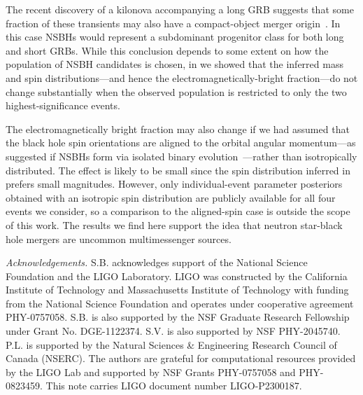 \documentclass[twocolumn]{aastex631}
\begin{document}
The recent discovery of a kilonova accompanying a long GRB suggests that some fraction of these transients may also have a compact-object merger origin~\citep{Troja:2022yya, Rastinejad:2022zbg}. In this case NSBHs would represent a subdominant progenitor class for both long and short GRBs. While this conclusion depends to some extent on how the population of NSBH candidates is chosen, 
in  we showed that the inferred mass and spin distributions---and hence the electromagnetically-bright fraction---do not change substantially when the observed population is restricted to only the two highest-significance events.%

The electromagnetically bright fraction may also change if we had assumed that the black hole spin orientations are aligned to the orbital angular momentum---as suggested if NSBHs form via isolated binary evolution~\citep[e.g.,][]{Broekgaarden:2021iew}---rather than isotropically distributed. The effect is likely to be small since the spin distribution inferred in  prefers small magnitudes. However, only individual-event parameter posteriors  obtained with an isotropic spin distribution are publicly available for all four events we consider, so a comparison to the aligned-spin case is outside the scope of this work. 
The results we find here support the idea that neutron star-black hole mergers are uncommon multimessenger sources. 

\textit{Acknowledgements. }
S.B. acknowledges support of the National Science Foundation and the LIGO Laboratory. LIGO was constructed by the California Institute of Technology and Massachusetts Institute of Technology with funding from the National Science Foundation and operates under cooperative agreement PHY-0757058. S.B. is also supported by the NSF Graduate Research Fellowship under Grant No. DGE-1122374. 
S.V. is also supported by NSF PHY-2045740. P.L. is supported by the Natural Sciences \& Engineering Research Council of Canada (NSERC). 
The authors are grateful for computational resources provided by the LIGO Lab and supported by NSF Grants PHY-0757058 and PHY-0823459. This note carries LIGO document number LIGO-P2300187.

{}

\end{document}
